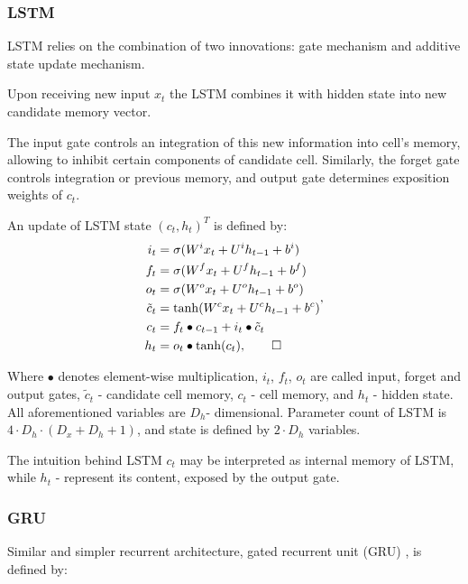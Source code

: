 \documentclass[a4paper,11pt]{article}
\begin{document}
\subsubsection{LSTM}


LSTM \cite{Hochreiter} relies on the combination of two innovations: gate mechanism and additive state update mechanism.

Upon receiving new input $x_{t}$ the LSTM combines it with hidden state into new candidate memory vector.

The input gate controls an integration of this new information into cell's memory, allowing to 
inhibit certain components of candidate cell. Similarly, the forget gate controls integration or previous memory, 
and output gate determines exposition weights of $c_{t}$.

An update of LSTM state $(c_{t}, h_{t})^{T}$ is defined by:
\begin{align}
\begin{split}
\label{LSTM}
i_{t} &=\sigma(W^{i}x_{t} + U^{i}h_{t-1} + b^{i})\\
f_{t} &=\sigma(W^{f}x_{t} + U^{f}h_{t-1} + b^{f})\\
o_{t} &=\sigma(W^{o}x_{t} + U^{o}h_{t-1} + b^{o})\\
\tilde{c}_{t} &= \tanh(W^{c}x_{t} + U^{c}h_{t-1} + b^{c})\\
c_{t} &=f_{t} \bullet c_{t-1} + i_{t} \bullet \tilde{c}_{t}\\
h_{t} &=o_{t} \bullet \tanh(c_{t}), \qedhere
\end{split},
\end{align}

Where $\bullet$ denotes element-wise multiplication, $i_{t}$, $f_{t}$, $o_{t}$ are called input, forget and 
output gates, $\tilde{c}_{t}$ - candidate cell memory, $c_{t}$ - cell memory, and $h_{t}$ - hidden state. 
All aforementioned variables are $D_{h}$- dimensional. Parameter count of LSTM is 
$4 \cdot D_{h} \cdot (D_{x}  + D_{h} + 1)$, and state is defined by $2 \cdot D_{h}$ variables.

The intuition behind LSTM
$c_{t}$ may be interpreted as internal memory of LSTM, while $h_{t}$ - represent its content, 
exposed by the output gate.

\subsubsection{GRU}
Similar and simpler recurrent architecture, gated recurrent unit (GRU) \cite{Chung}, is defined by:
\end{document}
